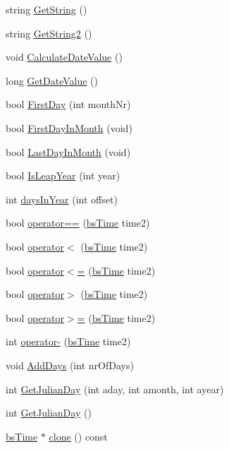 \begin{DoxyCompactItemize}
\item 
string \hyperlink{classbs_time_a3ad52506fb6d6f8501d1d52eb00efb0d}{GetString} ()
\item 
string \hyperlink{classbs_time_a3573b9448deb1114eb32070d3c179cee}{GetString2} ()
\item 
void \hyperlink{classbs_time_a790ba0e1a0b3ccf70e2fee6041909498}{CalculateDateValue} ()
\item 
long \hyperlink{classbs_time_aa0e43b35a00367231c77b49ab93a0700}{GetDateValue} ()
\item 
bool \hyperlink{classbs_time_a7be57616ef333837aff6f6e65b8ebff7}{FirstDay} (int monthNr)
\item 
bool \hyperlink{classbs_time_a910cd4c782f16cf949c26eb9de09fc5a}{FirstDayInMonth} (void)
\item 
bool \hyperlink{classbs_time_a4e1e8ac2838d301c1d019731ace417fb}{LastDayInMonth} (void)
\item 
bool \hyperlink{classbs_time_a0f580ba0f0255ced05439c50049529d6}{IsLeapYear} (int year)
\item 
int \hyperlink{classbs_time_a49ce82230b3774866e1636f6f09c8037}{daysInYear} (int offset)
\item 
bool \hyperlink{classbs_time_a885013e543021095601d1377ade2cbf1}{operator==} (\hyperlink{classbs_time}{bsTime} time2)
\item 
bool \hyperlink{classbs_time_a356f925ea169ae5a7a6057a4f132888e}{operator$<$} (\hyperlink{classbs_time}{bsTime} time2)
\item 
bool \hyperlink{classbs_time_ab76bf8c42eef5e941421b502783784ea}{operator$<$=} (\hyperlink{classbs_time}{bsTime} time2)
\item 
bool \hyperlink{classbs_time_aedb84a09d0c644f4bf9a28048a61bc24}{operator$>$} (\hyperlink{classbs_time}{bsTime} time2)
\item 
bool \hyperlink{classbs_time_ada715fa122c755bbce087557bcb85dfb}{operator$>$=} (\hyperlink{classbs_time}{bsTime} time2)
\item 
int \hyperlink{classbs_time_a87d7d9145aa5c21890dea28db22dba7d}{operator-\/} (\hyperlink{classbs_time}{bsTime} time2)
\item 
void \hyperlink{classbs_time_a251f783d4c967ab24b9509e7f46f4785}{AddDays} (int nrOfDays)
\item 
int \hyperlink{classbs_time_af5a34894c96b25a0ba8cf2a15d94e714}{GetJulianDay} (int aday, int amonth, int ayear)
\item 
int \hyperlink{classbs_time_a77148a065ee3c24e2e06f2f919bfe5f0}{GetJulianDay} ()
\item 
\hyperlink{classbs_time}{bsTime} $\ast$ \hyperlink{classbs_time_a36b213ecefd6c4e7a51eac4c27483270}{clone} () const 
\end{DoxyCompactItemize}

